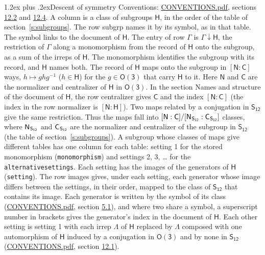 \documentclass[10pt,a4paper]{article}
\makeatletter
\renewcommand\section{\@startsection{section}{1}{\z@}{-3ex plus -1ex minus -.2ex}%
  {1.2ex plus .2ex}{\normalfont\large\sffamily\bfseries\color{parttitle}}}
\numberwithin{equation}{section}
\newcommand{\grp}[1]{\mathsf{#1}}
\newcommand{\grpindex}[2]{[#1 : #2]}
\newcommand{\restr}[2]{#1\!\downarrow#2}
\newcommand{\hairsp}{\mkern1mu}
\makeatother
\begin{document}
\section{Descent of symmetry}\label{s:subduction}
Conventions: \href{../../CONVENTIONS.pdf}{CONVENTIONS.pdf}, sections \href{../../CONVENTIONS.pdf\#conv.12.2}{12.2} and \href{../../CONVENTIONS.pdf\#conv.12.4}{12.4}.
A column is a class of subgroups $\grp{H}$, in the order of the table of section~\ref{s:subgroups}. The row subgrp names it by its symbol, as in that table. The symbol links to the document of $\grp{H}$. The entry of row $\Gamma$ is $\restr{\Gamma}{\grp{H}}$, the restriction of $\Gamma$ along a monomorphism from the record of $\grp{H}$ onto the subgroup, as a sum of the irreps of $\grp{H}$. The monomorphism identifies the subgroup with its record, and $\grp{H}$ names both. \label{n:group.normalizer.o3}\label{n:group.centralizer.o3}The record of $\grp{H}$ maps onto the subgroup in $\grpindex{\grp{N}}{\grp{C}}$ ways, $h \mapsto g h g^{-1}$ ($h \in \grp{H}$) for the $g \in \grp{O(3)}$ that carry $\grp{H}$ to it. Here $\grp{N}$ and $\grp{C}$ are the normalizer and centralizer of $\grp{H}$ in \href{O3.pdf}{$\grp{O(3)}$}. In the section Names and structure of the document of $\grp{H}$, the row centralizer gives $\grp{C}$ and the index $\grpindex{\grp{N}}{\grp{C}}$ (the index in the row normalizer is $\grpindex{\grp{N}}{\grp{H}}$). Two maps related by a conjugation in $\grp{S_{12}}$ give the same restriction. Thus the maps fall into $\grpindex{\grp{N}}{\grp{C}}/\grpindex{\grp{N}_{\hairsp \grp{S_{12}}}}{\grp{C}_{\hairsp \grp{S_{12}}}}$ classes, where $\grp{N}_{\hairsp \grp{S_{12}}}$ and $\grp{C}_{\hairsp \grp{S_{12}}}$ are the normalizer and centralizer of the subgroup in $\grp{S_{12}}$ (the table of section~\ref{s:subgroups}). \label{n:head.setting}A subgroup whose classes of maps give different tables has one column for each table: setting 1 for the stored monomorphism (\texttt{monomorphism}) and settings 2, 3, \dots{} for the \texttt{alternativesettings}. Each setting has the images of the generators of $\grp{H}$ (\texttt{setting}). \label{n:head.images}The row images gives, under each setting, each generator whose image differs between the settings, in their order, mapped to the class of $\grp{S_{12}}$ that contains its image. Each generator is written by the symbol of its class (\href{../../CONVENTIONS.pdf}{CONVENTIONS.pdf}, section \href{../../CONVENTIONS.pdf\#conv.5.1}{5.1}), and where two share a symbol, a superscript number in brackets gives the generator's index in the document of $\grp{H}$. \label{n:irrep.Delta}Each other setting is setting 1 with each irrep $\Lambda$ of $\grp{H}$ replaced by $\Lambda$ composed with one automorphism of $\grp{H}$ induced by a conjugation in \href{O3.pdf}{$\grp{O(3)}$} and by none in $\grp{S_{12}}$ (\href{../../CONVENTIONS.pdf}{CONVENTIONS.pdf}, section \href{../../CONVENTIONS.pdf\#conv.12.1}{12.1}).
\end{document}
